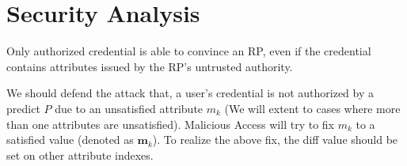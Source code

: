 \documentclass[journal]{IEEEtran}
\begin{document}
\section{Security Analysis}
Only authorized credential is able to convince an RP, even if the credential contains attributes issued by the RP's untrusted authority. 

We should defend the attack that, a user's credential is not authorized by a predict $P$ due to an unsatisfied attribute $m_k$ (We will extent to cases where more than one attributes are unsatisfied). Malicious Access will try to fix $m_k$ to a satisfied value (denoted as $\mathbf{m}_k$). To realize the above fix, the diff value should be set on other attribute indexes.



\end{document}

